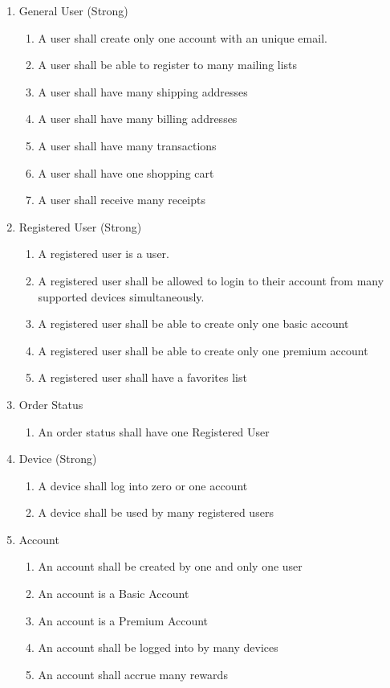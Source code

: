 \documentclass{article}
\begin{document}
\begin{enumerate}

\item General User (Strong)
\begin{enumerate}
	\item A user shall create only one account with an unique email.
	\item A user shall be able to register to many mailing lists
	\item A user shall have many shipping addresses
	\item A user shall have many billing addresses
	\item A user shall have many transactions
	\item A user shall have one shopping cart
	\item A user shall receive many receipts
\end{enumerate}
	
\item Registered User (Strong)
\begin{enumerate}
	\item A registered user is a user.
	\item A registered user shall be allowed to login to their account from many supported devices simultaneously.
	\item A registered user shall be able to create only one basic account
	\item A registered user shall be able to create only one premium account
	\item A registered user shall have a favorites list
\end{enumerate}

\item Order Status
\begin{enumerate}
	\item An order status shall have one Registered User
\end{enumerate}
	
\item Device (Strong)
\begin{enumerate}
	\item A device shall log into zero or one account
	\item A device shall be used by many registered users
\end{enumerate}

\item Account
\begin{enumerate}
	\item An account shall be created by one and only one user
	\item An account is a Basic Account
	\item An account is a Premium Account
	\item An account shall be logged into by many devices
	\item An account shall accrue many rewards
\end{enumerate}
	

\end{enumerate}
\end{document}
